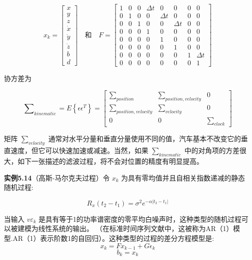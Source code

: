		  	
		  \[ x_{k}=\begin{bmatrix}
		  x\\y\\z\\\dot{x}\\\dot{y}\\\dot{z}\\b\\d
		  \end{bmatrix}\quad 和 \quad  F=\begin{bmatrix}
		  1&0&0&\Delta t&0&0&0&0\\0&1&0&0&\Delta t&0&0&0\\0&0&1&0&0&\Delta t&0&0\\0&0&0&1&0&0&0&0\\0&0&0&0&1&0&0&0\\0&0&0&0&0&1&0&0\\0&0&0&0&0&0&1&\Delta t\\0&0&0&0&0&0&0&1
		  \end{bmatrix}  \]
		  
		  协方差为
		  
		 \begin{equation}\label{5.30}
		 \sum\nolimits_{kinematic}=E\left\lbrace \epsilon\epsilon^{T}   \right\rbrace=\begin{bmatrix}
		 \sum\nolimits_{position}&\sum\nolimits_{position,velocity}&0\\\sum\nolimits_{position,velocity}&\sum\nolimits_{velocity}&0\\0&0&\sum\nolimits_{clock}
		 \end{bmatrix} 
		 \end{equation}
		  
		  矩阵 $ \sum\nolimits_{velocity} $ 通常对水平分量和垂直分量使用不同的值，汽车基本不改变它的垂直速度，但它可以快速加速或减速。当然，如果  $ \sum\nolimits_{kinematic} $ 中的对角项的方差很大，如下一张描述的滤波过程，将不会对位置的精度有明显提高。
		  
		  
		 \textbf{ 实例5.14}（高斯-马尔克夫过程）令 $ x_{k} $ 为具有零均值并且自相关指数递减的静态随机过程:
		 
		 \[ R_{x}(t_{2}-t_{1})=\sigma^{2}e^{-\alpha|t_{2}-t_{1}|} \] 
		 
		 
		 当输入  $v\varepsilon_{k} $ 是具有等于1的功率谱密度的零平均白噪声时，这种类型的随机过程可以被建模为线性系统的输出。 （在标准时间序列文献中，这被称为AR（1）模型.AR（1）表示阶数1的自回归）。这种类型的过程的差分方程模型是:
		  \[  x_{k}=Fx_{k-1}+G\epsilon_{k}\]
		 \begin{equation}\label{5.31}
		b_{k}=x_{k}
		\end{equation}
		 

